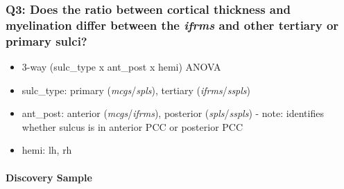 \documentclass[
]{article}
\newenvironment{Shaded}{\begin{snugshade}}{\end{snugshade}}
\newcommand{\CommentTok}[1]{\textcolor[rgb]{0.56,0.35,0.01}{\textit{#1}}}
\newcommand{\DataTypeTok}[1]{\textcolor[rgb]{0.13,0.29,0.53}{#1}}
\newcommand{\KeywordTok}[1]{\textcolor[rgb]{0.13,0.29,0.53}{\textbf{#1}}}
\newcommand{\NormalTok}[1]{#1}
\newcommand{\OperatorTok}[1]{\textcolor[rgb]{0.81,0.36,0.00}{\textbf{#1}}}
\newcommand{\StringTok}[1]{\textcolor[rgb]{0.31,0.60,0.02}{#1}}
\providecommand{\tightlist}{%
  \setlength{\itemsep}{0pt}\setlength{\parskip}{0pt}}
\begin{document}
\hypertarget{q3-does-the-ratio-between-cortical-thickness-and-myelination-differ-between-the-ifrms-and-other-tertiary-or-primary-sulci}{%
\subsubsection{\texorpdfstring{Q3: Does the ratio between cortical
thickness and myelination differ between the \emph{ifrms} and other
tertiary or primary
sulci?}{Q3: Does the ratio between cortical thickness and myelination differ between the ifrms and other tertiary or primary sulci?}}\label{q3-does-the-ratio-between-cortical-thickness-and-myelination-differ-between-the-ifrms-and-other-tertiary-or-primary-sulci}}

\begin{itemize}
\tightlist
\item
  3-way (sulc\_type x ant\_post x hemi) ANOVA
\item
  sulc\_type: primary (\emph{mcgs}/\emph{spls}), tertiary
  (\emph{ifrms}/\emph{sspls})
\item
  ant\_post: anterior (\emph{mcgs}/\emph{ifrms}), posterior
  (\emph{spls}/\emph{sspls}) - note: identifies whether sulcus is in
  anterior PCC or posterior PCC
\item
  hemi: lh, rh
\end{itemize}

\hypertarget{discovery-sample-2}{%
\paragraph{Discovery Sample}\label{discovery-sample-2}}

\begin{Shaded}
\end{Shaded}
\end{document}
